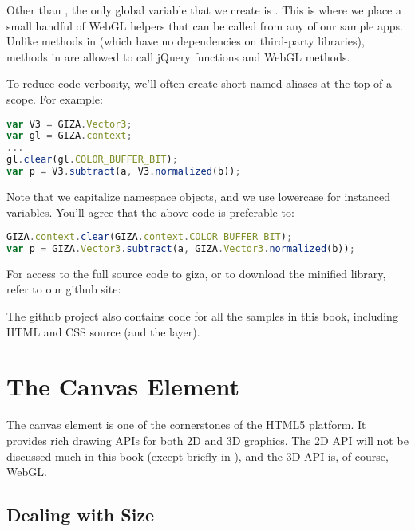 Other than , the only global variable that we create is .  This is where we place a small handful of WebGL helpers that can be called from any of our sample apps.  Unlike methods in  (which have no dependencies on third-party libraries), methods in  are allowed to call jQuery functions and WebGL methods.

To reduce code verbosity, we'll often create short-named aliases at the top of a scope.  For example:

\begin{lstlisting}[language=JavaScript]
var V3 = GIZA.Vector3;
var gl = GIZA.context;
...
gl.clear(gl.COLOR_BUFFER_BIT);
var p = V3.subtract(a, V3.normalized(b));
\end{lstlisting}

Note that we capitalize namespace objects, and we use lowercase for instanced variables.  You'll agree that the above code is preferable to:

\begin{lstlisting}[language=JavaScript]
GIZA.context.clear(GIZA.context.COLOR_BUFFER_BIT);
var p = GIZA.Vector3.subtract(a, GIZA.Vector3.normalized(b));
\end{lstlisting}

For access to the full source code to giza, or to download the minified library, refer to our github site:


The github project also contains code for all the samples in this book, including HTML and CSS source (and the  layer).

\section{The Canvas Element}

The canvas element  is one of the cornerstones of the HTML5 platform.  It provides rich drawing APIs for both 2D and 3D graphics.  The 2D API will not be discussed much in this book (except briefly in ), and the 3D API is, of course, WebGL.

\subsection{Dealing with Size}

